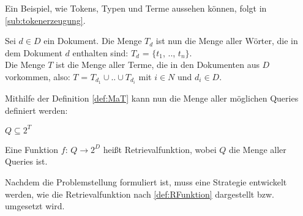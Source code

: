 Ein Beispiel, wie Tokens, Typen und Terme aussehen können, folgt in \ref{sub:tokenerzeugung}.

\begin{defi}\label{def:MaT}
	Sei $d \in D$ ein Dokument. Die Menge $T_d$ ist nun die Menge aller Wörter, die in dem Dokument $d$ enthalten sind: $T_d$ = $\{$$t_1$, .., $t_n$$\}$.
	\\
	Die Menge $T$ ist die Menge aller Terme, die in den Dokumenten aus $D$ vorkommen, also:
	$T$ = $T_{d_1} \cup .. \cup T_{d_i}$ mit $i \in N$ und $d_i \in D$.
\end{defi}
Mithilfe der Definition \ref{def:MaT} kann nun die Menge aller möglichen Queries definiert werden:
\begin{defi}\label{def:MamQ}
	$Q \subseteq 2^T$
\end{defi}
\begin{defi}[Retrievalfunktion]\label{def:RFunktion}
	Eine Funktion $f$: $Q \rightarrow 2^D$ heißt Retrievalfunktion, wobei $Q$ die Menge aller Queries ist.
\end{defi}
Nachdem die Problemstellung formuliert ist, muss eine Strategie entwickelt werden, wie die Retrievalfunktion nach \cref{def:RFunktion} dargestellt bzw. umgesetzt wird.
\\
